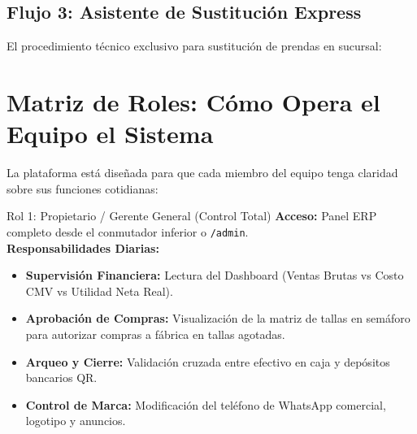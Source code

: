 \documentclass[11pt,a4paper]{article}
\begin{document}
\newpage

\subsection{Flujo 3: Asistente de Sustitución Express}
El procedimiento técnico exclusivo para sustitución de prendas en sucursal:

\begin{center}
\end{center}

\section{Matriz de Roles: Cómo Opera el Equipo el Sistema}

La plataforma está diseñada para que cada miembro del equipo tenga claridad sobre sus funciones cotidianas:

\begin{rolebox}{Rol 1: Propietario / Gerente General (Control Total)}
\textbf{Acceso:} Panel ERP completo desde el conmutador inferior o \texttt{/admin}.\\
\textbf{Responsabilidades Diarias:}
\begin{itemize}
    \item \textbf{Supervisión Financiera:} Lectura del Dashboard (Ventas Brutas vs Costo CMV vs Utilidad Neta Real).
    \item \textbf{Aprobación de Compras:} Visualización de la matriz de tallas en semáforo para autorizar compras a fábrica en tallas agotadas.
    \item \textbf{Arqueo y Cierre:} Validación cruzada entre efectivo en caja y depósitos bancarios QR.
    \item \textbf{Control de Marca:} Modificación del teléfono de WhatsApp comercial, logotipo y anuncios.
\end{itemize}
\end{rolebox}
\end{document}
